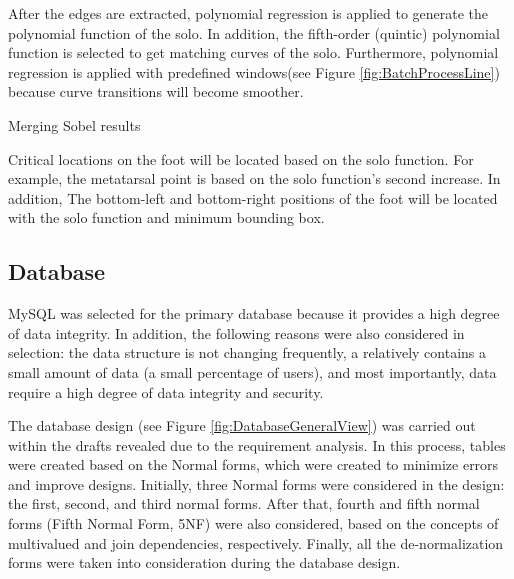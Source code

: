 After the edges are extracted, polynomial regression is applied to generate the polynomial function of the solo. In addition, the fifth-order (quintic) polynomial function is selected to get matching curves of the solo. Furthermore, polynomial regression is applied with predefined windows(see Figure \ref{fig:BatchProcessLine}) because curve transitions will become smoother.

\begin{algorithm}[htbp]
\caption{Merging Sobel results}\label{alg:CombinedSobelResults}
\label{alg:pca}
\hspace{1cm}
\end{algorithm}

Critical locations on the foot will be located based on the solo function. For example, the metatarsal point is based on the solo function's second increase. In addition, The bottom-left and bottom-right positions of the foot will be located with the solo function and minimum bounding box.

\subsection{Database} \label{sec:StudyIDatabase}

MySQL was selected for the primary database because it provides a high degree of data integrity. In addition, the following reasons were also considered in selection: the data structure is not changing frequently, a relatively contains a small amount of data (a small percentage of users), and most importantly, data require a high degree of data integrity and security.

The database design (see Figure \ref{fig:DatabaseGeneralView}) was carried out within the drafts revealed due to the requirement analysis. In this process, tables were created based on the Normal forms, which were created to minimize errors and improve designs. Initially, three Normal forms were considered in the design: the first, second, and third normal forms. After that, fourth and fifth normal forms (Fifth Normal Form, 5NF) were also considered, based on the concepts of multivalued and join dependencies, respectively. Finally, all the de-normalization forms were taken into consideration during the database design.

